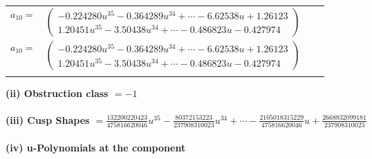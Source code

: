 \documentclass[1p]{elsarticle_modified}
\theoremstyle{definition}
\begin{document}
\begin{tabular}{m{7pt} m{180pt} m{7pt} m{180pt} }
\flushright $a_{10}=$&$\begin{pmatrix}-0.224280 u^{35}-0.364289 u^{34}+\cdots-6.62538 u+1.26123\\1.20451 u^{35}-3.50438 u^{34}+\cdots-0.486823 u-0.427974\end{pmatrix}$\\ \flushright $a_{10}=$&$\begin{pmatrix}-0.224280 u^{35}-0.364289 u^{34}+\cdots-6.62538 u+1.26123\\1.20451 u^{35}-3.50438 u^{34}+\cdots-0.486823 u-0.427974\end{pmatrix}$\\&\end{tabular}
\flushleft \textbf{(ii) Obstruction class $= -1$}\\~\\
\flushleft \textbf{(iii) Cusp Shapes $= \frac{132200220423}{475816620046} u^{35}-\frac{80372153223}{237908310023} u^{34}+\cdots-\frac{2105018315229}{475816620046} u+\frac{2668832099181}{237908310023}$}\\~\\
\newpage\renewcommand{\arraystretch}{1}
\flushleft \textbf{(iv) u-Polynomials at the component}\newline \\
\end{document}
